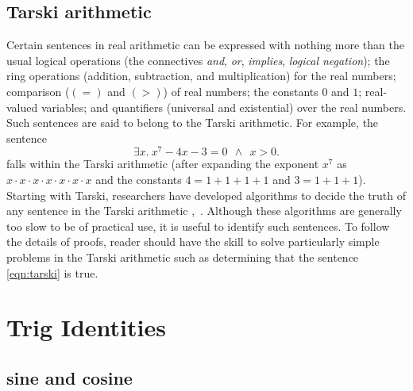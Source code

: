 \subsection{Tarski arithmetic}

\label{back:tarski}
  Certain sentences in real arithmetic can be expressed with nothing
  more than the usual logical operations (the connectives {\it and},
  {\it or}, {\it implies}, {\it logical negation}); the ring
  operations (addition, subtraction, and multiplication) for the real
  numbers; comparison ($(=)$ and $(>)$) of real numbers; the constants
  $0$ and $1$; real-valued variables; and quantifiers (universal and
  existential) over the real numbers.  Such sentences are said to
  belong to the Tarski arithmetic.  For example, the sentence
\begin{equation}\label{eqn:tarski}
\exists x.~x^7 - 4 x - 3 = 0 ~~\land~~ x > 0.
\end{equation}
falls within the Tarski arithmetic (after expanding the exponent $x^7$
as $x\cdot x\cdot x\cdot x\cdot x\cdot x\cdot x$ and the constants
$4=1+1+1+1$ and $3=1+1+1$).  Starting with Tarski, researchers have
developed algorithms to decide the truth of any sentence in the Tarski
arithmetic \cite{tarski-decision},~\cite{Mishra:1997}.  
Although these algorithms are generally too slow to be of practical
use, it is useful to identify such sentences.  To follow the details of proofs, 
reader should have the skill to solve particularly simple
problems in the Tarski arithmetic such as determining that the
sentence \eqref{eqn:tarski} is true.


\section{Trig Identities}


\subsection{sine and cosine}

